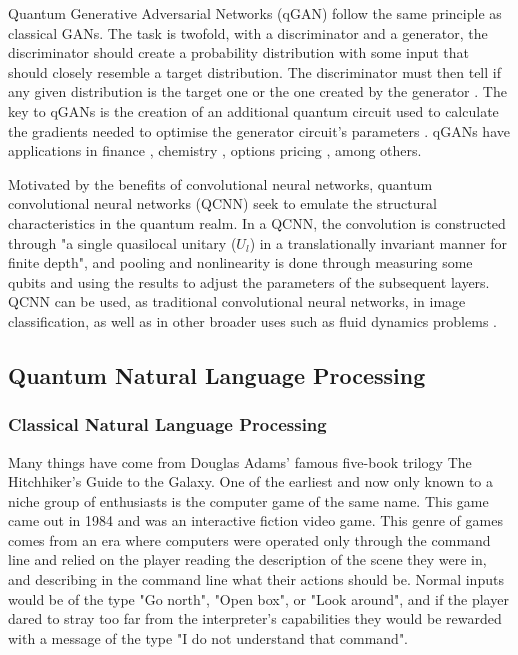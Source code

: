 Quantum Generative Adversarial Networks (qGAN) follow the same principle as classical GANs. The task is twofold, with a discriminator and a generator, the discriminator should create a probability distribution with some input that should closely resemble a target distribution. The discriminator must then tell if any given distribution is the target one or the one created by the generator \cite{goodfellow_generative_2014}. The key to qGANs is the creation of an additional quantum circuit used to calculate the gradients needed to optimise the generator circuit's parameters \cite{dallaire-demers_quantum_2018}. qGANs have applications in finance \cite{zoufal_quantum_2019}, chemistry \cite{kao_exploring_2023}, options pricing \cite{fuchs_hybrid_2023}, among others.

Motivated by the benefits of convolutional neural networks, quantum convolutional neural networks (QCNN) seek to emulate the structural characteristics in the quantum realm. In a QCNN, the convolution is constructed through \cite{cong_quantum_2019} "a single quasilocal unitary ($U_l$) in a translationally invariant manner for finite depth", and pooling and nonlinearity is done through measuring some qubits and using the results to adjust the parameters of the subsequent layers. QCNN can be used, as traditional convolutional neural networks, in image classification, as well as in other broader uses such as fluid dynamics problems \cite{umeano_what_2024}.

\subsection{Quantum Natural Language Processing}

\subsubsection{Classical Natural Language Processing}
Many things have come from Douglas Adams' famous five-book trilogy The Hitchhiker's Guide to the Galaxy. One of the earliest and now only known to a niche group of enthusiasts is the computer game of the same name. This game came out in 1984 and was an interactive fiction video game. This genre of games comes from an era where computers were operated only through the command line and relied on the player reading the description of the scene they were in, and describing in the command line what their actions should be. Normal inputs would be of the type "Go north", "Open box", or "Look around", and if the player dared to stray too far from the interpreter's capabilities they would be rewarded with a message of the type "I do not understand that command".

